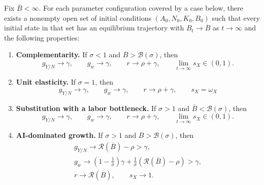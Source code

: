 \begin{proposition}
\label{prop:rewrite-equilibrium-regimes}
Fix $\overline B<\infty$.
For each parameter configuration covered by
a case below, there exists a nonempty open set of initial conditions
$(A_0,N_0,K_0,B_0)$ such that every initial state in that set has an
equilibrium trajectory with $B_t\to\overline B$ as $t\to\infty$ and the
following properties:
\begin{enumerate}[label=(\roman*),ref=\theproposition(\roman*),leftmargin=*,itemsep=0.5em]
 \item \textnormal{\textbf{Complementarity.}}
 \label{prop:rewrite-capped-complements-existence}
 If $\sigma<1$ and $\overline B>\mathcal B(\sigma)$, then
 \begin{equation}
  g_{Y/N}\to\gamma,\qquad g_w\to\gamma,\qquad
  r\to\rho+\gamma,\qquad \lim_{t\to\infty}s_X\in(0,1).
  \label{eq:rewrite-complements-terminal}
 \end{equation}

 \item \textnormal{\textbf{Unit elasticity.}}
 \label{prop:rewrite-capped-unit-existence}
 If $\sigma=1$, then
 \begin{equation}
  g_{Y/N}\to\gamma,\qquad g_w\to\gamma,\qquad r\to\rho+\gamma,\qquad s_X=\omega_X
  \label{eq:rewrite-unit-terminal}
 \end{equation}

 \item \textnormal{\textbf{Substitution with a labor bottleneck.}}
 \label{prop:rewrite-capped-substitutes-labor-existence}
 If $\sigma>1$ and $\overline B<\mathcal B(\sigma)$, then
 \begin{equation}
  g_{Y/N}\to\gamma,\qquad g_w\to\gamma,\qquad
  r\to\rho+\gamma,\qquad \lim_{t\to\infty}s_X\in(0,1).
  \label{eq:rewrite-substitutes-labor-terminal}
 \end{equation}

 \item \textnormal{\textbf{AI-dominated growth.}}
 \label{prop:rewrite-capped-substitutes-existence}
 If $\sigma>1$ and $\overline B>\mathcal B(\sigma)$, then
 \begin{gather}
  g_{Y/N}\to\mathcal R(\overline B)-\rho>\gamma,
  \label{eq:rewrite-substitutes-ai-limits}\\
  g_w\to\left(1-\frac{1}{\sigma}\right)\gamma+
  \frac{1}{\sigma}\left(\mathcal R(\overline B)-\rho\right)>\gamma,
  \label{eq:rewrite-substitutes-wage-growth}\\
  r\to\mathcal R(\overline B),\qquad s_X\to1. \nonumber
 \end{gather}
\end{enumerate}
\end{proposition}

